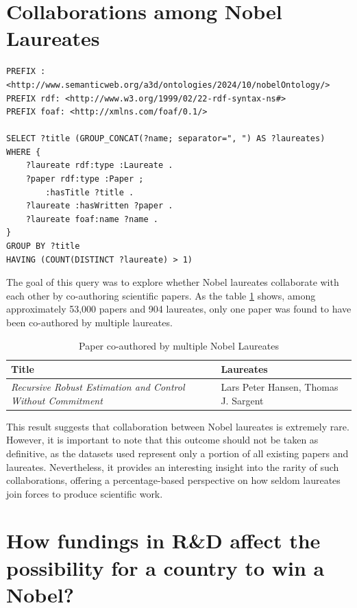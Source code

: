 \documentclass{article}
\begin{document}
\section{Collaborations among Nobel Laureates}

\begin{lstlisting}
PREFIX : <http://www.semanticweb.org/a3d/ontologies/2024/10/nobelOntology/>
PREFIX rdf: <http://www.w3.org/1999/02/22-rdf-syntax-ns#>
PREFIX foaf: <http://xmlns.com/foaf/0.1/>

SELECT ?title (GROUP_CONCAT(?name; separator=", ") AS ?laureates) WHERE {
    ?laureate rdf:type :Laureate .
    ?paper rdf:type :Paper ;
        :hasTitle ?title .
    ?laureate :hasWritten ?paper .
    ?laureate foaf:name ?name .
}
GROUP BY ?title
HAVING (COUNT(DISTINCT ?laureate) > 1)
\end{lstlisting}

\vspace{1em}

The goal of this query was to explore whether Nobel laureates collaborate with each other by co-authoring
scientific papers. As the table \ref{tab:laureates_collaboration} shows, among approximately 53,000 papers
and 904 laureates, only one paper was found to have been co-authored by multiple laureates.

\begin{table}[H]
	\caption{Paper co-authored by multiple Nobel Laureates}
	\centering
	\begin{tabular}{|l|l|}
		\hline
		\textbf{Title}                                                      & \textbf{Laureates}                   \\ \hline
		\textit{Recursive Robust Estimation and Control Without Commitment} & Lars Peter Hansen, Thomas J. Sargent \\ \hline
	\end{tabular}
	\label{tab:laureates_collaboration}
\end{table}

This result suggests that collaboration between Nobel laureates is extremely rare. However, it is important to
note that this outcome should not be taken as definitive, as the datasets used represent only a portion of all
existing papers and laureates. Nevertheless, it provides an interesting insight into the rarity of such
collaborations, offering a percentage-based perspective on how seldom laureates join forces to produce scientific
work.

\section{How fundings in R\&D affect the possibility for a country to win a Nobel?}
\end{document}
